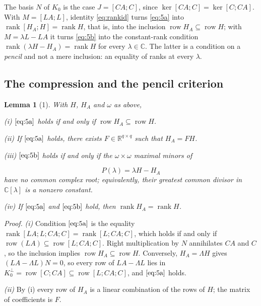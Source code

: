 \documentclass[journal]{IEEEtran}
\theoremstyle{plainn}
\newtheorem*{lem}{Lemma}
\begin{document}
The basis $N$ of $K_0$ is the case $J=[CA;C]$, since $\ker[CA;C]=\ker[C;CA]$. With
$M=[LA;L]$, identity \eqref{eq:rankid} turns \eqref{eq:5a} into
$\operatorname{rank}[H_A;H]=\operatorname{rank}H$, that is, into the inclusion
$\operatorname{row}H_A\subseteq\operatorname{row}H$; with $M=\lambda L-LA$ it turns
\eqref{eq:5b} into the constant-rank condition
$\operatorname{rank}(\lambda H-H_A)=\operatorname{rank}H$ for every $\lambda\in\mathbb C$.
The latter is a condition on a \emph{pencil} and not a mere inclusion: an equality of
ranks at every $\lambda$.

\subsection{The compression and the pencil criterion}\label{sec:compression}
\begin{lem}[1] With $H$, $H_A$ and $\omega$ as above,

(i) $\eqref{eq:5a}$ holds if and only if $\operatorname{row}H_A\subseteq\operatorname{row}H$.

(ii) If $\eqref{eq:5a}$ holds, there exists $F\in\mathbb R^{q\times q}$ such that $H_A=FH$.

(iii) $\eqref{eq:5b}$ holds if and only if the $\omega\times\omega$ maximal minors of

\begin{equation}
P(\lambda)=\lambda H-H_A
\end{equation}
have no common complex root; equivalently, their greatest common divisor in $\mathbb C[\lambda]$ is a nonzero constant.

(iv) If $\eqref{eq:5a}$ and $\eqref{eq:5b}$ hold, then $\operatorname{rank}H_A=\operatorname{rank}H$.

\end{lem}
\emph{Proof.}
\emph{(i)} Condition $\eqref{eq:5a}$ is the equality $\operatorname{rank}[LA;L;CA;C]=\operatorname{rank}[L;CA;C]$, which holds if and only if $\operatorname{row}(LA)\subseteq\operatorname{row}[L;CA;C]$. Right multiplication by $N$ annihilates $CA$ and $C$, so the inclusion implies $\operatorname{row}H_A\subseteq\operatorname{row}H$. Conversely, $H_A=\Lambda H$ gives $(LA-\Lambda L)N=0$, so every row of $LA-\Lambda L$ lies in $K_0^{\perp}=\operatorname{row}[C;CA]\subseteq\operatorname{row}[L;CA;C]$, and $\eqref{eq:5a}$ holds.

\emph{(ii)} By (i) every row of $H_A$ is a linear combination of the rows of $H$; the matrix of coefficients is $F$.
\end{document}
